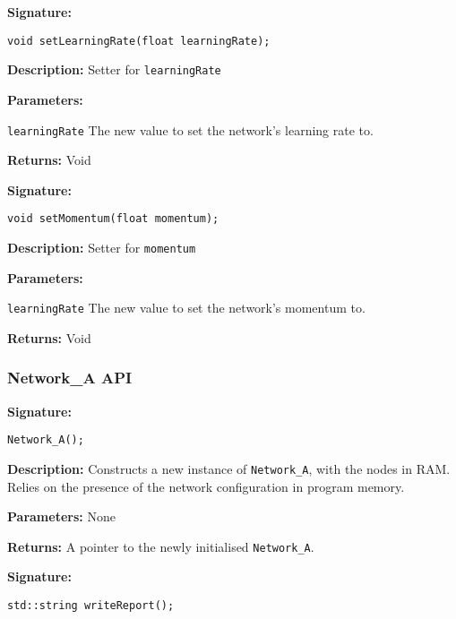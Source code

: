 \documentclass[a4paper]{article}
\begin{document}
\hrulefill %

\textbf{Signature:} \begin{lstlisting}
void setLearningRate(float learningRate);
\end{lstlisting}

\textbf{Description: }
Setter for \lstinline{learningRate}

\textbf{Parameters: }

\lstinline{learningRate} The new value to set the network's learning rate to.

\textbf{Returns: } Void

\hrulefill %

\textbf{Signature:} \begin{lstlisting}
void setMomentum(float momentum);
\end{lstlisting}

\textbf{Description: }
Setter for \lstinline{momentum}

\textbf{Parameters: }

\lstinline{learningRate} The new value to set the network's momentum to.

\textbf{Returns: } Void

\hrulefill %

\subsubsection{Network\_A API}%

\hrulefill %

\textbf{Signature:} \begin{lstlisting}
Network_A();
\end{lstlisting}

\textbf{Description: }
Constructs a new instance of \lstinline{Network_A}, with the nodes in RAM. Relies on the presence of the network configuration in program memory.

\textbf{Parameters: } None

\textbf{Returns: }
A pointer to the newly initialised \lstinline{Network_A}.

\hrulefill %

\textbf{Signature:} \begin{lstlisting}
std::string writeReport();
\end{lstlisting}
\end{document}
